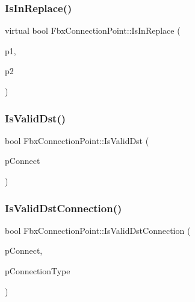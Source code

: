 \subsubsection{\texorpdfstring{Is\+In\+Replace()}{IsInReplace()}}
{\footnotesize\ttfamily virtual bool Fbx\+Connection\+Point\+::\+Is\+In\+Replace (\begin{DoxyParamCaption}\item[{\hyperlink{class_fbx_connection_point}{Fbx\+Connection\+Point} $\ast$}]{p1,  }\item[{\hyperlink{class_fbx_connection_point}{Fbx\+Connection\+Point} $\ast$}]{p2 }\end{DoxyParamCaption})\hspace{0.3cm}{\ttfamily [virtual]}}

\mbox{\label{class_fbx_connection_point_af2fc3a91ca6a8afd4c51ff40bf505ba6}} 
\subsubsection{\texorpdfstring{Is\+Valid\+Dst()}{IsValidDst()}}
{\footnotesize\ttfamily bool Fbx\+Connection\+Point\+::\+Is\+Valid\+Dst (\begin{DoxyParamCaption}\item[{\hyperlink{class_fbx_connection_point}{Fbx\+Connection\+Point} $\ast$}]{p\+Connect }\end{DoxyParamCaption})}

\mbox{\label{class_fbx_connection_point_a29090e1e331e55a1cf68c5c742dfd771}} 
\subsubsection{\texorpdfstring{Is\+Valid\+Dst\+Connection()}{IsValidDstConnection()}}
{\footnotesize\ttfamily bool Fbx\+Connection\+Point\+::\+Is\+Valid\+Dst\+Connection (\begin{DoxyParamCaption}\item[{\hyperlink{class_fbx_connection_point}{Fbx\+Connection\+Point} $\ast$}]{p\+Connect,  }\item[{\hyperlink{class_fbx_connection_a3df448a5db356652ab99fd2be2553749}{Fbx\+Connection\+::\+E\+Type}}]{p\+Connection\+Type }\end{DoxyParamCaption})}

